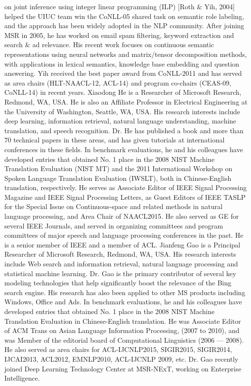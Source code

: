 on joint inference using integer linear programming (ILP) [Roth \& Yih, 2004] helped the UIUC team win the CoNLL-05 shared task on semantic role labeling, and the approach has been widely adopted in the NLP community. After joining MSR in 2005, he has worked on email spam filtering, keyword extraction and search \& ad relevance. His recent work focuses on continuous semantic representations using neural networks and matrix/tensor decomposition methods, with applications in lexical semantics, knowledge base embedding and question answering. Yih received the best paper award from CoNLL-2011 and has served as area chairs (HLT-NAACL-12, ACL-14) and program co-chairs (CEAS-09, CoNLL-14) in recent years. Xiaodong He is a Researcher of Microsoft Research, Redmond, WA, USA. He is also an Affiliate Professor in Electrical Engineering at the University of Washington, Seattle, WA, USA. His research interests include deep learning, information retrieval, natural language understanding, machine translation, and speech recognition. Dr. He has published a book and more than 70 technical papers in these areas, and has given tutorials at international conferences in these fields. In benchmark evaluations, he and his colleagues have developed entries that obtained No. 1 place in the 2008 NIST Machine Translation Evaluation (NIST MT) and the 2011 International Workshop on Spoken Language Translation Evaluation (IWSLT), both in Chinese-English translation, respectively. He serves as Associate Editor of IEEE Signal Processing Magazine and IEEE Signal Processing Letters, as Guest Editors of IEEE TASLP for the Special Issue on Continuous-space and related methods in natural language processing, and Area Chair of NAACL2015. He also served as GE for several IEEE Journals, and served in organizing committees and program committees of major speech and language processing conferences in the past. He is a senior member of IEEE and a member of ACL. Jianfeng Gao is a Principal Researcher of Microsoft Research, Redmond, WA, USA. His research interests include Web search and information retrieval, natural language processing and statistical machine learning. Dr. Gao is the primary contributor of several key modeling technologies that help significantly boost the relevance of the Bing search engine. His research has also been applied to other MS products including Windows, Office and Ads.  In benchmark evaluations, he and his colleagues have developed entries that obtained No. 1 place in the 2008 NIST Machine Translation Evaluation in Chinese-English translation. He was Associate Editor of ACM Trans on Asian Language Information Processing, (2007 to 2010), and was Member of the editorial board of Computational Linguistics (2006 --- 2008). He also served as area chairs for ACL-IJCNLP2015, SIGIR2015, SIGIR2014, IJCAI2013, ACL2012, EMNLP2010, ACL-IJCNLP 2009, etc. Dr. Gao recently joined Deep Learning Technology Center at MSR-NExT, working on Enterprise Intelligence.
